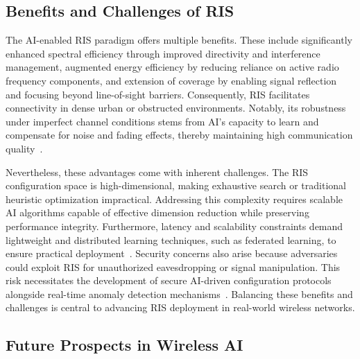 \documentclass[sigconf]{acmart}
\begin{document}
\subsection{Benefits and Challenges of RIS}

The AI-enabled RIS paradigm offers multiple benefits. These include significantly enhanced spectral efficiency through improved directivity and interference management, augmented energy efficiency by reducing reliance on active radio frequency components, and extension of coverage by enabling signal reflection and focusing beyond line-of-sight barriers. Consequently, RIS facilitates connectivity in dense urban or obstructed environments. Notably, its robustness under imperfect channel conditions stems from AI’s capacity to learn and compensate for noise and fading effects, thereby maintaining high communication quality~\cite{ref49}.

Nevertheless, these advantages come with inherent challenges. The RIS configuration space is high-dimensional, making exhaustive search or traditional heuristic optimization impractical. Addressing this complexity requires scalable AI algorithms capable of effective dimension reduction while preserving performance integrity. Furthermore, latency and scalability constraints demand lightweight and distributed learning techniques, such as federated learning, to ensure practical deployment~\cite{ref49}. Security concerns also arise because adversaries could exploit RIS for unauthorized eavesdropping or signal manipulation. This risk necessitates the development of secure AI-driven configuration protocols alongside real-time anomaly detection mechanisms~\cite{ref49}. Balancing these benefits and challenges is central to advancing RIS deployment in real-world wireless networks.

\subsection{Future Prospects in Wireless AI}
\end{document}
